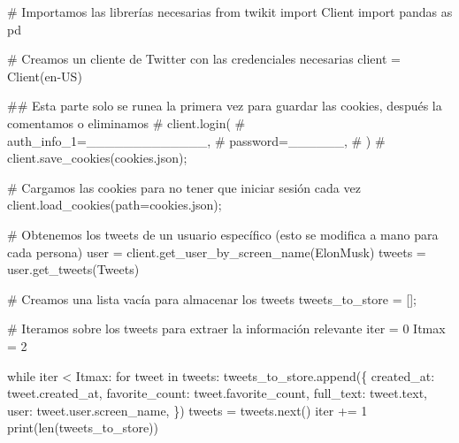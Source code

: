 \documentclass[
  letterpaper,
  DIV=11,
  numbers=noendperiod]{scrartcl}
\newenvironment{Shaded}{\begin{snugshade}}{\end{snugshade}}
\newcommand{\BuiltInTok}[1]{\textcolor[rgb]{0.00,0.23,0.31}{#1}}
\newcommand{\CommentTok}[1]{\textcolor[rgb]{0.37,0.37,0.37}{#1}}
\newcommand{\ControlFlowTok}[1]{\textcolor[rgb]{0.00,0.23,0.31}{#1}}
\newcommand{\DecValTok}[1]{\textcolor[rgb]{0.68,0.00,0.00}{#1}}
\newcommand{\ImportTok}[1]{\textcolor[rgb]{0.00,0.46,0.62}{#1}}
\newcommand{\KeywordTok}[1]{\textcolor[rgb]{0.00,0.23,0.31}{#1}}
\newcommand{\NormalTok}[1]{\textcolor[rgb]{0.00,0.23,0.31}{#1}}
\newcommand{\OperatorTok}[1]{\textcolor[rgb]{0.37,0.37,0.37}{#1}}
\newcommand{\StringTok}[1]{\textcolor[rgb]{0.13,0.47,0.30}{#1}}
\begin{document}
\begin{Shaded}
\begin{Highlighting}[]
\CommentTok{\# Importamos las librerías necesarias}
\ImportTok{from}\NormalTok{ twikit }\ImportTok{import}\NormalTok{ Client}
\ImportTok{import}\NormalTok{ pandas }\ImportTok{as}\NormalTok{ pd}

\CommentTok{\# Creamos un cliente de Twitter con las credenciales necesarias}
\NormalTok{client }\OperatorTok{=}\NormalTok{ Client(}\StringTok{\textquotesingle{}en{-}US\textquotesingle{}}\NormalTok{)}

\CommentTok{\#\# Esta parte solo se runea la primera vez para guardar las cookies, después la comentamos o eliminamos}
\CommentTok{\# client.login(}
\CommentTok{\#     auth\_info\_1=\textquotesingle{}\_\_\_\_\_\_\_\_\_\_\_\_\_\textquotesingle{},}
\CommentTok{\#     password=\textquotesingle{}\_\_\_\_\_\_\textquotesingle{},}
\CommentTok{\# )}
\CommentTok{\# client.save\_cookies(\textquotesingle{}cookies.json\textquotesingle{});}

\CommentTok{\# Cargamos las cookies para no tener que iniciar sesión cada vez}
\NormalTok{client.load\_cookies(path}\OperatorTok{=}\StringTok{\textquotesingle{}cookies.json\textquotesingle{}}\NormalTok{)}\OperatorTok{;}

\CommentTok{\# Obtenemos los tweets de un usuario específico (esto se modifica a mano para cada persona)}
\NormalTok{user }\OperatorTok{=}\NormalTok{ client.get\_user\_by\_screen\_name(}\StringTok{\textquotesingle{}ElonMusk\textquotesingle{}}\NormalTok{)}
\NormalTok{tweets }\OperatorTok{=}\NormalTok{ user.get\_tweets(}\StringTok{\textquotesingle{}Tweets\textquotesingle{}}\NormalTok{)}

\CommentTok{\# Creamos una lista vacía para almacenar los tweets}
\NormalTok{tweets\_to\_store }\OperatorTok{=}\NormalTok{ []}\OperatorTok{;}

\CommentTok{\# Iteramos sobre los tweets para extraer la información relevante}
\BuiltInTok{iter} \OperatorTok{=} \DecValTok{0}
\NormalTok{Itmax }\OperatorTok{=} \DecValTok{2}

\ControlFlowTok{while} \BuiltInTok{iter} \OperatorTok{\textless{}}\NormalTok{ Itmax:}
    \ControlFlowTok{for}\NormalTok{ tweet }\KeywordTok{in}\NormalTok{ tweets:}
\NormalTok{        tweets\_to\_store.append(\{}
            \StringTok{\textquotesingle{}created\_at\textquotesingle{}}\NormalTok{: tweet.created\_at,}
            \StringTok{\textquotesingle{}favorite\_count\textquotesingle{}}\NormalTok{: tweet.favorite\_count,}
            \StringTok{\textquotesingle{}full\_text\textquotesingle{}}\NormalTok{: tweet.text,}
            \StringTok{\textquotesingle{}user\textquotesingle{}}\NormalTok{: tweet.user.screen\_name,}
\NormalTok{        \})}
\NormalTok{    tweets }\OperatorTok{=}\NormalTok{ tweets.}\BuiltInTok{next}\NormalTok{()}
    \BuiltInTok{iter} \OperatorTok{+=} \DecValTok{1}
    \BuiltInTok{print}\NormalTok{(}\BuiltInTok{len}\NormalTok{(tweets\_to\_store))}


\end{Highlighting}
\end{Shaded}
\end{document}
